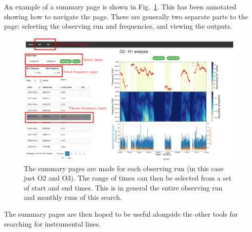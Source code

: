 An example of a summary page is shown in Fig.~\ref{detchar:summary:plots}. This has been annotated showing how to navigate the page. 
There are generally two separate parts to the page: selecting the observing run and frequencies, and viewing the outputs.


\begin{figure}
	\centering
	\includegraphics[width=\textwidth]{C5_detchar/summary_annot.pdf}
	\caption{The summary pages are made for each observing run (in this case just O2 and O3). The range of times can then be selected from a set of start and end times. This is in general the entire observing run and monthly runs of this search.}
	\label{detchar:summary:plots}
\end{figure}

The summary pages are then hoped to be useful alongside the other tools for searching for instrumental lines. 

